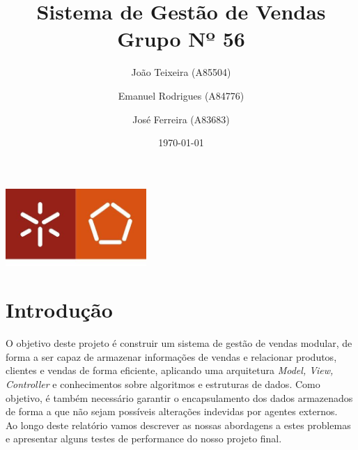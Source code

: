 \documentclass[a4paper]{report}
\begin{document}
\title{Sistema de Gestão de Vendas\\ 
\large Grupo Nº 56}
\author{João Teixeira (A85504) \and Emanuel Rodrigues (A84776) \and José Ferreira (A83683)}
\date{\today}

\begin{center}
    \begin{minipage}{0.75\linewidth}
        \centering
        \includegraphics[width=0.4\textwidth]{eng.jpeg}\par\vspace{1cm}
        \vspace{1.5cm}
        \href{https://www.uminho.pt/PT}
        {\color{black}{\scshape\LARGE Universidade do Minho}} \par
        \vspace{1cm}
        \href{https://www.di.uminho.pt/}
        {\color{black}{\scshape\Large Departamento de Informática}} \par
        \vspace{1.5cm}
        \maketitle
    \end{minipage}
\end{center}

\tableofcontents

\pagebreak

\chapter{Introdução}

O objetivo deste projeto é construir um sistema de gestão de vendas modular,
de forma a ser capaz de armazenar informações de vendas e relacionar produtos,
clientes e vendas de forma eficiente, aplicando uma arquitetura \textit{Model, View,
Controller} e conhecimentos sobre algoritmos e estruturas de dados. Como objetivo, 
é também necessário garantir o encapsulamento dos dados armazenados de forma
a que não sejam possíveis alterações indevidas por agentes externos.\\
Ao longo deste relatório vamos descrever as nossas abordagens a estes problemas e
apresentar alguns testes de performance do nosso projeto final.
\end{document}
